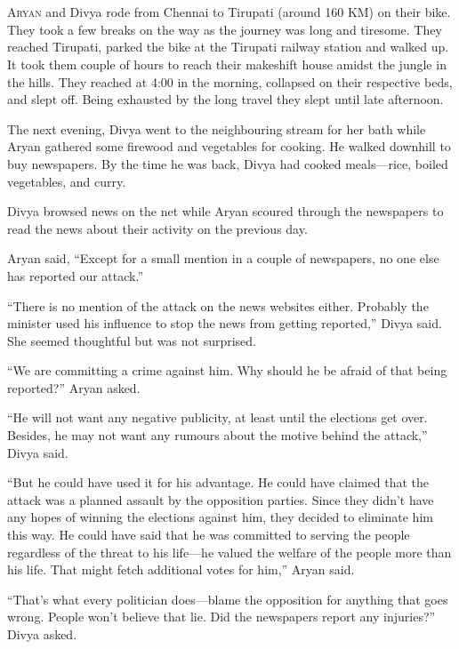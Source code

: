 \chapter{}
\lettrine{A}{ryan} and Divya rode from Chennai to Tirupati (around 160 KM) on their bike.
They took a few breaks on the way as the journey was long and tiresome. They
reached Tirupati, parked the bike at the Tirupati railway station and walked up.
It took them couple of hours to reach their makeshift house amidst the jungle in
the hills. They reached at 4:00 in the morning, collapsed on their respective
beds, and slept off. Being exhausted by the long travel they slept until late
afternoon.

The next evening, Divya went to the neighbouring stream for her bath while Aryan
gathered some firewood and vegetables for cooking. He walked downhill to buy
newspapers. By the time he was back, Divya had cooked meals—rice, boiled
vegetables, and curry.

Divya browsed news on the net while Aryan scoured through the newspapers to read
the news about their activity on the previous day.

Aryan said, “Except for a small mention in a couple of newspapers, no one else
has reported our attack.”

“There is no mention of the attack on the news websites either. Probably the
minister used his influence to stop the news from getting reported,” Divya said.
She seemed thoughtful but was not surprised.

“We are committing a crime against him. Why should he be afraid of that being
reported?” Aryan asked.

“He will not want any negative publicity, at least until the elections get over.
Besides, he may not want any rumours about the motive behind the attack,” Divya
said.

“But he could have used it for his advantage. He could have claimed that the
attack was a planned assault by the opposition parties. Since they didn't have
any hopes of winning the elections against him, they decided to eliminate him
this way. He could have said that he was committed to serving the people
regardless of the threat to his life—he valued the welfare of the people more
than his life. That might fetch additional votes for him,” Aryan said.

“That's what every politician does—blame the opposition for anything that goes
wrong. People won't believe that lie. Did the newspapers report any injuries?”
Divya asked.

